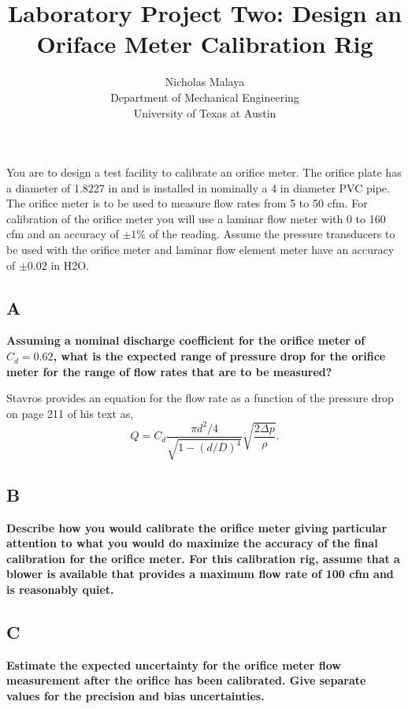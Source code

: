 \documentclass{article}
\title{\bf{Laboratory Project Two: Design an Oriface Meter Calibration Rig}}
\author{Nicholas Malaya \\ Department of Mechanical Engineering \\ University of Texas at Austin} \date{}
\begin{document}
\maketitle
\date{}

You are to design a test facility to calibrate an orifice meter. The orifice plate has a diameter of
1.8227 in and is installed in nominally a 4 in diameter PVC pipe. The orifice meter is to be used 
to measure flow rates from 5 to 50 cfm. For calibration of the orifice meter you will use a 
laminar flow meter with 0 to 160 cfm and an accuracy of $\pm 1\%$ of the reading. Assume the 
pressure transducers to be used with the orifice meter and laminar flow element meter have an 
accuracy of $\pm 0.02$ in H2O.

\subsection*{A}
\textbf{Assuming a nominal discharge coefficient for the orifice meter of $C_d = 0.62$, what is the
expected range of pressure drop for the orifice meter for the range of flow rates that are to be 
measured?}

Stavros provides an equation for the flow rate as a function of the
pressure drop on page 211 of his text as,  
\begin{equation}
 Q = C_d \frac{\pi d^2 / 4}{\sqrt{1-(d/D)^4}}\sqrt{\frac{2 \Delta p}{\rho}}.
\end{equation}



\subsection*{B}
\textbf{Describe how you would calibrate the orifice meter giving particular attention to what you
would do maximize the accuracy of the final calibration for the orifice meter. For this 
calibration rig, assume that a blower is available that provides a maximum flow rate of 100 
cfm and is reasonably quiet.}

\subsection*{C}
\textbf{Estimate the expected uncertainty for the orifice meter flow measurement after the orifice has
been calibrated. Give separate values for the precision and bias uncertainties.}
\end{document}
